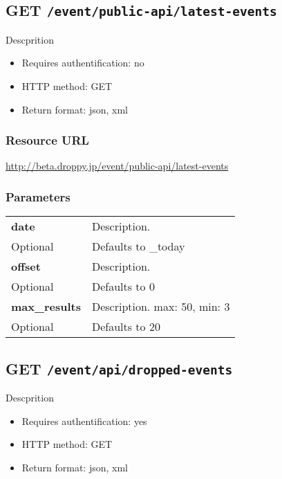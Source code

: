 \documentclass[11pt,a4paper]{article}
\newcommand{\content}[1]{\begin{minipage}{10cm}\vspace{2mm}#1\vspace{2mm}\end{minipage}}
\begin{document}
      
  \subsection*{GET {\tt /event/public-api/latest-events}}
  Descprition
  \begin{itemize}
  \item Requires authentification: no
  \item HTTP method: GET
  \item Return format: json, xml
  \end{itemize}
  \subsubsection*{Resource URL}
  \url{http://beta.droppy.jp/event/public-api/latest-events}
  \subsubsection*{Parameters}
  \begin{table}[h]
    \begin{center}
      \begin{tabular}{l l}
        \hline 
      \textbf{date} & \content{Description. }
      \\
      Optional & Defaults to \_today\\
      \hline
      \textbf{offset} & \content{Description. }
      \\
      Optional & Defaults to 0\\
      \hline
      \textbf{max\_results} & \content{Description. max: 50, min: 3}
      \\
      Optional & Defaults to 20\\
      \hline
      \end{tabular}
    \end{center}
  \end{table}
  
      \newpage
      
      
  \subsection*{GET {\tt /event/api/dropped-events}}
  Descprition
  \begin{itemize}
  \item Requires authentification: yes
  \item HTTP method: GET
  \item Return format: json, xml
  \end{itemize}
\end{document}
